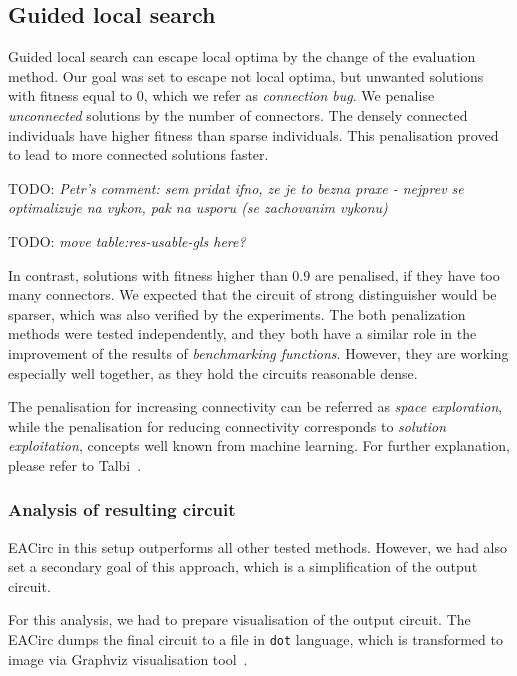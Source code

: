 \documentclass[
  print, %
  Table,   %
  nolof,     %
  nolot,     %
  11pt, %
  oneside  %
]{fithesis3}
\newcommand{\todo}[1]{TODO: \textit{#1}}
\begin{document}
\subsection{Guided local search}
\label{subsec:res-ss-gls}

Guided local search can escape local optima by the change of the evaluation method. Our goal was set to escape not local optima, but unwanted solutions with fitness equal to 0, which we refer as \textit{connection bug}. We penalise \textit{unconnected} solutions by the number of connectors. The densely connected individuals have higher fitness than sparse individuals. This penalisation proved to lead to more connected solutions faster.

\todo{Petr's comment: sem pridat ifno, ze je to bezna praxe - nejprev se optimalizuje na vykon, pak na usporu (se zachovanim vykonu)}

\todo{move table:res-usable-gls here?}

In contrast, solutions with fitness higher than 0.9 are penalised, if they have too many connectors. We expected that the circuit of strong distinguisher would be sparser, which was also verified by the experiments. The both penalization methods were tested independently, and they both have a similar role in the improvement of the results of \textit{benchmarking functions}. However, they are working especially well together, as they hold the circuits reasonable dense.

The penalisation for increasing connectivity can be referred as \textit{space exploration}, while the penalisation for reducing connectivity corresponds to \textit{solution exploitation}, concepts well known from machine learning. For further explanation, please refer to Talbi~\cite[section 1.3.3, page 24]{talbi2009metaheuristics}.

\subsubsection{\textbf{Analysis of resulting circuit}}
\label{subsubsec:res-ss-gls-circ-anal}

EACirc in this setup outperforms all other tested methods. However, we had also set a secondary goal of this approach, which is a simplification of the output circuit.

For this analysis, we had to prepare visualisation of the output circuit. The EACirc dumps the final circuit to a file in \texttt{dot} language, which is transformed to image via Graphviz visualisation tool~\cite{ellson2001graphviz}.
\end{document}
